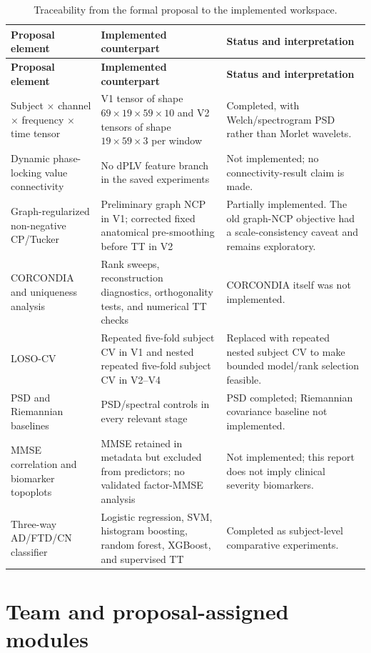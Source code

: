 \begin{longtable}{p{}p{}p{}}
\caption{Traceability from the formal proposal to the implemented workspace.}
\label{tab:traceability}\\
\toprule
\textbf{Proposal element} & \textbf{Implemented counterpart} & \textbf{Status and interpretation}\\
\midrule
\endfirsthead
\toprule
\textbf{Proposal element} & \textbf{Implemented counterpart} & \textbf{Status and interpretation}\\
\midrule
\endhead
Subject $\times$ channel $\times$ frequency $\times$ time tensor &
V1 tensor of shape $69\times19\times59\times10$ and V2 tensors of shape
$19\times59\times3$ per window & Completed, with Welch/spectrogram PSD rather
than Morlet wavelets.\\
Dynamic phase-locking value connectivity & No dPLV feature branch in the saved
experiments & Not implemented; no connectivity-result claim is made.\\
Graph-regularized non-negative CP/Tucker & Preliminary graph NCP in V1; corrected
fixed anatomical pre-smoothing before TT in V2 & Partially implemented. The old
graph-NCP objective had a scale-consistency caveat and remains exploratory.\\
CORCONDIA and uniqueness analysis & Rank sweeps, reconstruction diagnostics,
orthogonality tests, and numerical TT checks & CORCONDIA itself was not
implemented.\\
LOSO-CV & Repeated five-fold subject CV in V1 and nested repeated five-fold
subject CV in V2--V4 & Replaced with repeated nested subject CV to make bounded
model/rank selection feasible.\\
PSD and Riemannian baselines & PSD/spectral controls in every relevant stage &
PSD completed; Riemannian covariance baseline not implemented.\\
MMSE correlation and biomarker topoplots & MMSE retained in metadata but excluded
from predictors; no validated factor-MMSE analysis & Not implemented; this
report does not imply clinical severity biomarkers.\\
Three-way AD/FTD/CN classifier & Logistic regression, SVM, histogram boosting,
random forest, XGBoost, and supervised TT & Completed as subject-level
comparative experiments.\\
\bottomrule
\end{longtable}

\section{Team and proposal-assigned modules}


